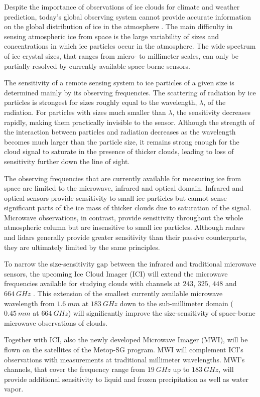 \documentclass[journal abbreviation, manuscript]{copernicus}
\begin{document}
Despite the importance of observations of ice clouds for climate and weather
prediction, today's global observing system cannot provide accurate information
on the global distribution of ice in the atmosphere
\citep{eliasson11,duncan18a}. The main difficulty in sensing atmospheric ice
from space is the large variability of sizes and concentrations in which ice
particles occur in the atmosphere. The wide spectrum of ice crystal sizes, that
ranges from micro- to millimeter scales, can only be partially resolved by
currently available space-borne sensors.

The sensitivity of a remote sensing system to ice particles of a given size is
determined mainly by its observing frequencies. The scattering of radiation by
ice particles is strongest for sizes roughly equal to the wavelength, $\lambda$,
of the radiation. For particles with sizes much smaller than $\lambda$, the
sensitivity decreases rapidly, making them practically invisible to the sensor.
Although the strength of the interaction between particles and radiation
decreases as the wavelength becomes much larger than the particle size, it
remains strong enough for the cloud signal to saturate in the presence of
thicker clouds, leading to loss of sensitivity further down the line of sight.

The observing frequencies that are currently available for measuring ice from
space are limited to the microwave, infrared and optical domain. Infrared and
optical sensors provide sensitivity to small ice particles but cannot sense
significant parts of the ice mass of thicker clouds due to saturation of the
signal. Microwave observations, in contrast, provide sensitivity throughout the
whole atmospheric column but are insensitive to small ice particles. Although
radars and lidars generally provide greater sensitivity than their passive
counterparts, they are ultimately limited by the same principles.

To narrow the size-sensitivity gap between the infrared and traditional microwave
sensors, the upcoming Ice Cloud Imager (ICI) will extend the microwave
frequencies available for studying clouds with channels at $243$, $325$, $448$ and
$664\ \unit{GHz}$ \citep{Eriksson19}. This extension of the smallest currently available microwave
wavelength from $1.6\ \unit{mm}$ at $183\ \unit{GHz}$ down to the sub-millimeter
domain ($0.45\ \unit{mm}$ at $664\ \unit{GHz}$) will significantly improve the
size-sensitivity of space-borne microwave observations of clouds.

Together with ICI, also the newly developed Microwave Imager (MWI), will be
flown on the satellites of the Metop-SG program. MWI will complement ICI's
observations with measurements at traditional millimeter wavelengths. MWI's
channels, that cover the frequency range from $19\ \unit{GHz}$ up to
$183\ \unit{GHz}$, will provide additional sensitivity to liquid and frozen
precipitation as well as water vapor.
\end{document}
